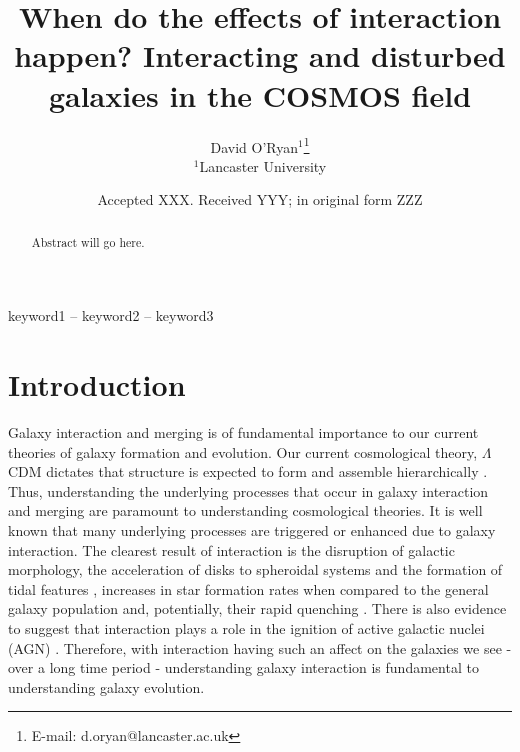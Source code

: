 \documentclass[fleqn,usenatbib]{mnras}
\title[Interactions in COSMOS]{When do the effects of interaction happen? Interacting and disturbed galaxies in the COSMOS field}
\author[D. O'Ryan et al.]{
David O'Ryan$^{1}$\thanks{E-mail: d.oryan@lancaster.ac.uk}
\\
$^{1}$Lancaster University \\
}
\date{Accepted XXX. Received YYY; in original form ZZZ}
\begin{document}
\label{firstpage}
\pagerange{\pageref{firstpage}--\pageref{lastpage}}
\maketitle

\begin{abstract}
   Abstract will go here.
\end{abstract}

\begin{keywords}
keyword1 -- keyword2 -- keyword3
\end{keywords}


\section{Introduction}\label{introduction}
\noindent Galaxy interaction and merging is of fundamental importance to our current theories of galaxy formation and evolution. Our current cosmological theory, $\Lambda$CDM dictates that structure is expected to form and assemble hierarchically \citep{1978MNRAS.183..341W, 2001MNRAS.328..726S, 2013MNRAS.436.1765M}. Thus, understanding the underlying processes that occur in galaxy interaction and merging are paramount to understanding cosmological theories. It is well known that many underlying processes are triggered or enhanced due to galaxy interaction. The clearest result of interaction is the disruption of galactic morphology, the acceleration of disks to spheroidal systems and the formation of tidal features \citep{1972ApJ...178..623T, 1977ApJ...212..616T, 2005MNRAS.357..753G, 2009MNRAS.397..802H}, increases in star formation rates when compared to the general galaxy population \citep{1991ApJ...370L..65B, 2006ApJ...652...56B, 2014MNRAS.437.2137S, 2015ApJ...807L..16K} and, potentially, their rapid quenching \citep{2013MNRAS.430.1901H, 2023RAA....23i5026D}. There is also evidence to suggest that interaction plays a role in the ignition of active galactic nuclei (AGN) \citep{2011MNRAS.418.2043E, 2015ApJ...806..219C, 2023MNRAS.523.4164H}. Therefore, with interaction having such an affect on the galaxies we see - over a long time period - understanding galaxy interaction is fundamental to understanding galaxy evolution.
\end{document}
